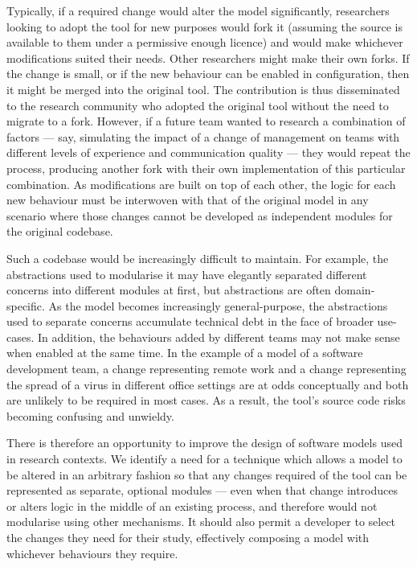 Typically, if a required change would alter the model significantly, researchers
looking to adopt the tool for new purposes would fork it (assuming the source is
available to them under a permissive enough licence) and would make whichever
modifications suited their needs. Other researchers might make their own forks.
If the change is small, or if the new behaviour can be enabled in configuration,
then it might be merged into the original tool. The contribution is thus
disseminated to the research community who adopted the original tool without the
need to migrate to a fork. However, if a future team wanted to research a
combination of factors --- say, simulating the impact of a change of management
on teams with different levels of experience and communication quality --- they
would repeat the process, producing another fork with their own implementation
of this particular combination. As modifications are built on top of each other,
the logic for each new behaviour must be interwoven with that of the original
model in any scenario where those changes cannot be developed as independent
modules for the original codebase.

Such a codebase would be increasingly difficult to maintain. For example, the
abstractions used to modularise it may have elegantly separated different
concerns into different modules at first, but abstractions are often
domain-specific. As the model becomes increasingly general-purpose, the
abstractions used to separate concerns accumulate technical debt in the face of
broader use-cases. In addition, the behaviours added by different teams may not
make sense when enabled at the same time. In the example of a model of a
software development team, a change representing remote work and a change
representing the spread of a virus in different office settings are at odds
conceptually and both are unlikely to be required in most cases. As a result,
the tool's source code risks becoming confusing and unwieldy.

There is therefore an opportunity to improve the design of software models used
in research contexts. We identify a need for a technique which allows a model to
be altered in an arbitrary fashion so that any changes required of the tool can
be represented as separate, optional modules --- even when that change
introduces or alters logic in the middle of an existing process, and therefore
would not modularise using other mechanisms. It should also permit a developer
to select the changes they need for their study, effectively composing a model
with whichever behaviours they require.



